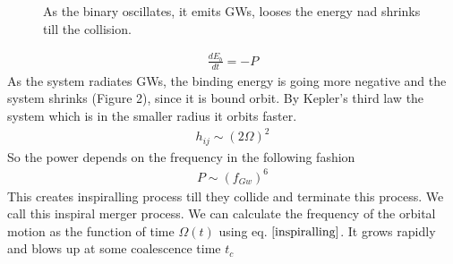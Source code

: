 \documentclass[11pt]{article}
\begin{document}
\begin{figure} [H]
\begin{center}


        \caption{ As the binary oscillates, it emits GWs, looses the energy nad shrinks till the collision.}
            \end{center}
    \end{figure}


\begin{align}
\frac{dE_b}{dt} = -P   \label{inspiralling}
\end{align}
 As the system radiates GWs, the binding energy is going more negative and the system shrinks (Figure 2), since it is bound orbit. By Kepler's third law the system which is in the smaller radius it orbits faster.
\begin{align}
h_{ij} \sim (2\Omega)^2
\end{align}
So the power depends on the frequency in the following fashion
\begin{align}
P \sim (f_{Gw})^6
\end{align}
This creates inspiralling process till they collide and terminate this process. We call this inspiral merger process.
We can calculate the frequency of the orbital motion as the function of time $\Omega(t)$ using eq. $\ref{inspiralling}$. It grows rapidly and blows up at some coalescence time $t_c$
\end{document}

